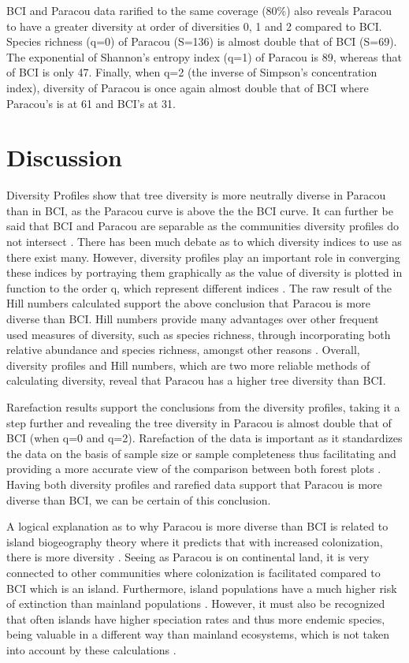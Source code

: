 \documentclass[fleqn,10pt]{ArtEcoFoG} %
\begin{document}
BCI and Paracou data rarified to the same coverage (80\%) also reveals
Paracou to have a greater diversity at order of diversities 0, 1 and 2
compared to BCI. Species richness (q=0) of Paracou (S=136) is almost
double that of BCI (S=69). The exponential of Shannon's entropy index
(q=1) of Paracou is 89, whereas that of BCI is only 47. Finally, when
q=2 (the inverse of Simpson's concentration index), diversity of Paracou
is once again almost double that of BCI where Paracou's is at 61 and
BCI's at 31.

\section{Discussion}\label{discussion}

Diversity Profiles show that tree diversity is more neutrally diverse in
Paracou than in BCI, as the Paracou curve is above the the BCI curve. It
can further be said that BCI and Paracou are separable as the
communities diversity profiles do not intersect \citep{marcon2017}.
There has been much debate as to which diversity indices to use as there
exist many. However, diversity profiles play an important role in
converging these indices by portraying them graphically as the value of
diversity is plotted in function to the order q, which represent
different indices \citep{Tothmeresz1995, marcon2017}. The raw result of
the Hill numbers calculated support the above conclusion that Paracou is
more diverse than BCI. Hill numbers provide many advantages over other
frequent used measures of diversity, such as species richness, through
incorporating both relative abundance and species richness, amongst
other reasons \citep{Chao2014}. Overall, diversity profiles and Hill
numbers, which are two more reliable methods of calculating diversity,
reveal that Paracou has a higher tree diversity than BCI.

Rarefaction results support the conclusions from the diversity profiles,
taking it a step further and revealing the tree diversity in Paracou is
almost double that of BCI (when q=0 and q=2). Rarefaction of the data is
important as it standardizes the data on the basis of sample size or
sample completeness thus facilitating and providing a more accurate view
of the comparison between both forest plots \citep{Chao2014}. Having
both diversity profiles and rarefied data support that Paracou is more
diverse than BCI, we can be certain of this conclusion.

A logical explanation as to why Paracou is more diverse than BCI is
related to island biogeography theory where it predicts that with
increased colonization, there is more diversity \citep{BRV:BRV510}.
Seeing as Paracou is on continental land, it is very connected to other
communities where colonization is facilitated compared to BCI which is
an island. Furthermore, island populations have a much higher risk of
extinction than mainland populations \citep{Frankham1997}. However, it
must also be recognized that often islands have higher speciation rates
and thus more endemic species, being valuable in a different way than
mainland ecosystems, which is not taken into account by these
calculations \citep{Kier9322}.
\end{document}
